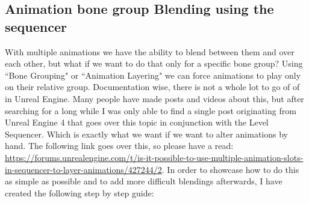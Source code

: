 \documentclass{uva-inf-article}
\begin{document}
\subsection{Animation bone group Blending using the sequencer}
With multiple animations we have the ability to blend between them and over each other, but what if we want to do that only for a specific bone group? Using ``Bone Grouping" or ``Animation Layering" we can force animations to play only on their relative group. Documentation wise, there is not a whole lot to go of of in Unreal Engine. Many people have made posts and videos about this, but after searching for a long while I was only able to find a single post originating from Unreal Engine 4 that goes over this topic in conjunction with the Level Sequencer. Which is exactly what we want if we want to alter animations by hand. The following link goes over this, so please have a read: \url{https://forums.unrealengine.com/t/is-it-possible-to-use-multiple-animation-slots-in-sequencer-to-layer-animations/427244/2}. In order to showcase how to do this as simple as possible and to add more difficult blendings afterwards, I have created the following step by step guide:
\end{document}
